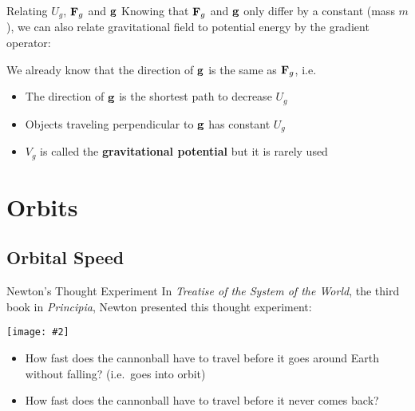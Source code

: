 \documentclass[12pt,compress,aspectratio=169]{beamer}
\newcommand{\pic}[2]{\texttt{[image: \#2]}}
\newcommand{\mb}[1]{\ensuremath\mathbf{#1}}
\newcommand{\eq}[2]{\vspace{#1}{\Large\begin{displaymath}#2\end{displaymath}}}
\begin{document}
\begin{frame}{Relating $U_g$, $\mb{F}_g$ and $\mb{g}$}
  Knowing that $\mb{F}_g$ and $\mb{g}$ only differ by a constant (mass $m$), we
  can also relate gravitational field to potential energy by the gradient
  operator:

  \eq{-.15in}{
    \mb{g}%
    =-\nabla V_g=-\frac{\partial V_g}{\partial r}\hat{\mb{r}}
    \quad\text{where}\quad
    V_g=\frac{U_g}{m}
  }

  We already know that the direction of $\mb{g}$ is the same as $\mb{F}_g$,
  i.e.
  \begin{itemize}
  \item The direction of $\mb{g}$ is the shortest path to decrease $U_g$ 
  \item Objects traveling perpendicular to $\mb{g}$ has constant $U_g$
  \item $V_g$ is called the \textbf{gravitational potential} but
    it is rarely used
  \end{itemize}
\end{frame}



\section{Orbits}

\subsection{Orbital Speed}

\begin{frame}{Newton's Thought Experiment}
  In \emph{Treatise of the System of the World}, the third book in
  \emph{Principia}, Newton presented this thought experiment:
  \begin{center}
    \pic{.8}{figure-5.png}
  \end{center}
  \begin{itemize}
  \item How fast does the cannonball have to travel before it goes around Earth
    without falling? (i.e.\ goes into orbit)
  \item How fast does the cannonball have to travel before it never comes back?
  \end{itemize}
\end{frame}
\end{document}
